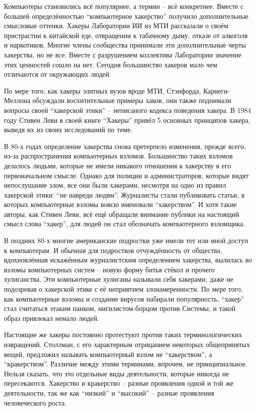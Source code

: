 Компьютеры становились всё популярнее, а термин -- всё конкретнее. Вместе с большей определённостью \enquote{компьютерное хакерство} получило дополнительные смысловые оттенки. Хакеры Лаборатории ИИ из МТИ рассказали о своём пристрастии к китайской еде, отвращении к табачному дыму, отказе от алкоголя и наркотиков. Многие члены сообщества принимали эти дополнительные черты хакерства, но не все. Вместе с разрушением коллектива Лаборатории значение этих ценностей сошло на нет. Сегодня большинство хакеров мало чем отличаются от окружающих людей.

По мере того, как хакеры элитных вузов вроде МТИ, Стэнфорда, Карнеги-Меллона обсуждали восхитительные примеры хаков, они также поднимали вопросы своей \enquote{хакерской этики} -- неписаного кодекса поведения хакера. В 1984 году Стивен Леви в своей книге \enquote{Хакеры} привёл 5 основных принципов хакера, выведя их из своих исследований по теме.

В 80-х годах определение хакерства снова претерпело изменения, прежде всего, из-за распространения компьютерных взломов. Большинство таких взломов делалось людьми, которые не имели никакого отношения к хакерству в его первоначальном смысле. Однако для полиции и администраторов, которые видят непослушание злом, все они были хакерами, несмотря на одно из правил хакерской этики: \enquote{не навреди людям}. Журналисты стали публиковать статьи, в которых компьютерные взломы вовсю именовали \enquote{хакерством}. И хотя такие авторы, как Стивен Леви, всё ещё обращали внимание публики на настоящий смысл слова \enquote{хакер}, для людей он стал обозначать компьютерного взломщика.

В поздних 80-х многие американские подростки уже имели тот или иной доступ к компьютерам. И обычная для подростков отчуждённость от общества, вдохновлённая искажённым журналистским определением хакерства, вылилась во взломы компьютерных систем -- новую форму битья стёкол и прочего хулиганства. Эти компьютерные хулиганы называли себя хакерами, даже не подозревая о хакерской этике с её неприятием злонамеренности. По мере того, как компьютерные взломы и создание вирусов набирали популярность, \enquote{хакер} стал считаться этаким панком, нигилистом-борцом против Системы, и такой образ привлекал немало людей.

Настоящие же хакеры постоянно протестуют против таких терминологических извращений. Столлман, с его характерным отрицанием некоторых общепринятых вещей, предложил называть компьютерный взлом не \enquote{хакерством}, а \enquote{кракерством}. Различие между этими терминами, впрочем, не принципиальное. Нельзя сказать, что это отдельные виды деятельности, которые никогда не пересекаются. Хакерство и кракерство -- разные проявления одной и той же деятельности, так же как \enquote{низкий} и \enquote{высокий} -- разные проявления человеческого роста.

